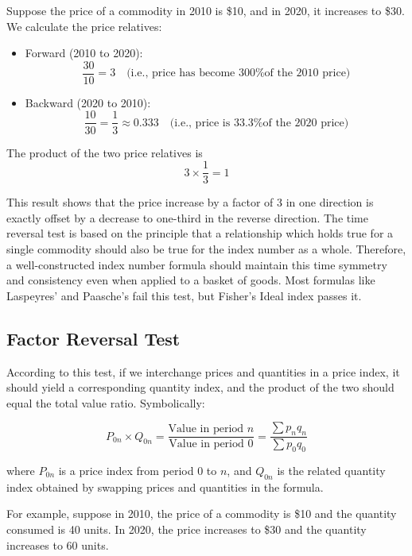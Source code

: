 \documentclass[twoside]{book}
\begin{document}
Suppose the price of a commodity in 2010 is \$10, and in 2020, it increases to \$30. We calculate the price relatives:

\begin{itemize}
  \item {Forward (2010 to 2020):}
  \[
  \dfrac{30}{10} = 3 \quad \text{(i.e., price has become 300\% of the 2010 price)}
  \]

  \item {Backward (2020 to 2010):}
  \[
  \dfrac{10}{30} = \dfrac{1}{3} \approx 0.333 \quad \text{(i.e., price is 33.3\% of the 2020 price)}
  \]
\end{itemize}

 The product of the two price relatives is
\[
3 \times \dfrac{1}{3} = 1
\]

This result shows that the price increase by a factor of 3 in one direction is exactly offset by a decrease to one-third in the reverse direction. The time reversal test is based on the principle that a relationship which holds true for a single commodity should also be true for the index number as a whole. Therefore, a well-constructed index number formula should maintain this time symmetry and consistency even when applied to a basket of goods. Most formulas like Laspeyres' and Paasche's fail this test, but Fisher's Ideal index passes it.

\subsection{Factor Reversal Test}
According to this test, if we interchange prices and quantities in a price index, it should yield a corresponding quantity index, and the product of the two should equal the total value ratio. Symbolically:
\begin{textbox}
\[
  P_{0n} \times Q_{0n} = \dfrac{\text{Value in period }n}{\text{Value in period }0}=\dfrac{\sum p_n q_n}{\sum p_0 q_0}
\]
\end{textbox}

where \(P_{0n}\) is a price index from period 0 to \(n\), and \(Q_{0n}\) is the related quantity index obtained by swapping prices and quantities in the formula.

For example, suppose in 2010, the price of a commodity is \$10 and the quantity consumed is 40 units. In 2020, the price increases to \$30 and the quantity increases to 60 units.
\end{document}

